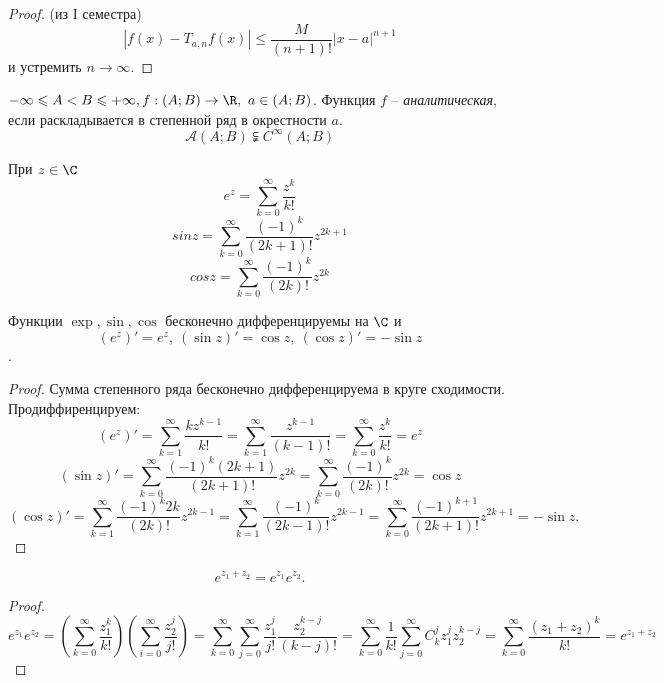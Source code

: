\begin{proof}
	(из I семестра) $$|f(x) - T_{a, n} f(x)| \leqslant \frac{M}{(n+1)!} |x - a|^{n + 1}$$ и устремить $n \to \infty$.
\end{proof}

\begin{Def}
	$-\infty \leqslant A < B \leqslant + \infty, f: (A;B) \to \R, \ a \in (A; B)$. Функция $f$ -- \textit{аналитическая}, если раскладывается в степенной ряд в окрестности $a$.
	$$\mathcal{A}(A; B) \subsetneqq C^{\infty}(A;B)$$
\end{Def}


\begin{Def}
    При $z \in \C$
    $$e^z = \sum_{k = 0}^{\infty} \frac{z^k}{k!}$$
    $$sin z = \sum_{k = 0}^{\infty} \frac{(-1)^k}{(2k + 1)!}z^{2k + 1}$$
    $$cos z = \sum_{k = 0}^{\infty} \frac{(-1)^k}{(2k)!}z^{2k}$$
\end{Def}

\begin{Thm}[Т1]
    Функции $\exp, \sin, \cos$ бесконечно дифференцируемы на $\C$ и 
    $$(e^z)' = e^z, \ (\sin z)' = \cos z, \ (\cos z)' = - \sin z$$.
\end{Thm}

\begin{proof}
    Сумма степенного ряда бесконечно дифференцируема в круге сходимости. Продиффиренцируем:
    $$(e^z)' = \sum_{k = 1}^{\infty} \frac{k z^{k - 1}}{k!} = \sum_{k = 1}^{\infty} \frac{z^{k - 1}}{(k - 1)!} = \sum_{k = 0}^{\infty} \frac{z^k}{k!} = e^z$$
    $$(\sin z)' = \sum_{k = 0}^{\infty} \frac{(-1)^k(2k+1)}{(2k+1)!}z^{2k} = \sum_{k = 0}^{\infty} \frac{(-1)^k}{(2k)!}z^{2k} = \cos z$$
    $$(\cos z)' = \sum_{k = 1}^{\infty} \frac{(-1)^k 2k}{(2k)!}z^{2k - 1} = \sum_{k = 1}^{\infty} \frac{(-1)^k}{(2k - 1)!} z^{2k - 1} = \sum_{k = 0}^{\infty} \frac{(-1)^{k + 1}}{(2k + 1)!} z^{2k + 1} = -\sin z.$$
\end{proof}

\begin{Thm}
    $$e^{z_1 + z_2} = e^{z_1}e^{z_2}.$$
\end{Thm}

\begin{proof}
    $$e^{z_1}e^{z_2} = \left(\sum_{k=0}^{\infty}\frac{z_1^k}{k!}\right) \left( \sum_{i = 0}^{\infty} \frac{z_2^j}{j!} \right) = \sum_{k = 0}^{\infty} \sum_{j = 0}^{\infty} \frac{z_1^j}{j!} \frac{z_2^{k - j}}{(k - j)!} = \sum_{k = 0}^{\infty} \frac{1}{k!} \sum_{j = 0}^{\infty} C_k^j z_1^j z_2^{k - j} = \sum_{k = 0}^{\infty} \frac{(z_1 + z_2)^k}{k!} = e^{z_1 +z_2}$$
\end{proof}

